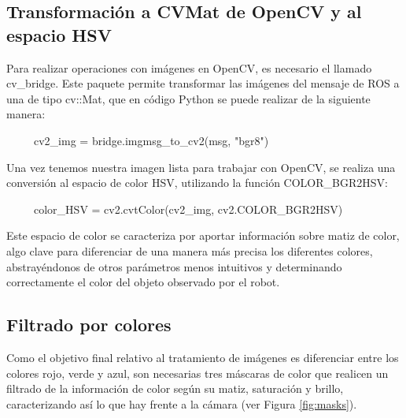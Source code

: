 \documentclass[12pt,spanish,chapterprefix, numbers=noenddot]{book}
\numberwithin{equation}{section}
\numberwithin{figure}{section}
\begin{document}
\subsection{Transformación a CVMat de OpenCV y al espacio HSV}

Para realizar operaciones con imágenes en OpenCV, es necesario el llamado cv\_bridge. Este paquete permite transformar las imágenes del mensaje de ROS a una de tipo cv::Mat, que en código Python se puede realizar de la siguiente manera: 
    
\ \ \ \ \ cv2\_img = bridge.imgmsg\_to\_cv2(msg, "bgr8")

Una vez tenemos nuestra imagen lista para trabajar con OpenCV, se realiza una conversión al espacio de color HSV, utilizando la función COLOR\_BGR2HSV:

\ \ \ \ \ color\_HSV = cv2.cvtColor(cv2\_img, cv2.COLOR\_BGR2HSV)

Este espacio de color se caracteriza por aportar información sobre matiz de color, algo clave para diferenciar de una manera más precisa los diferentes colores, abstrayéndonos de otros parámetros menos intuitivos y determinando correctamente el color del objeto observado por el robot. 

\subsection{Filtrado por colores}

Como el objetivo final relativo al tratamiento de imágenes es diferenciar entre los colores rojo, verde y azul, son necesarias tres máscaras de color que realicen un filtrado de la información de color según su matiz, saturación y brillo, caracterizando así lo que hay frente a la cámara (ver Figura \ref{fig:masks}).
\end{document}
